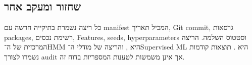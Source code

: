 \subsection{שחזור ומעקב אחר }

כל ריצה נשמרת בתיקייה חדשה עם manifest המכיל תאריך, Git commit, גרסאות packages, רשימת נכסים, Features, seeds, hyperparameters וסטטוס השלמה. הריצה המרכזית של ה־HMM היא , והריצה של מודלי ה־Supervised ML היא . תוצאות קודמות נשמרו לצורך audit אך אינן משמשות לטענות המספריות בדוח זה.
